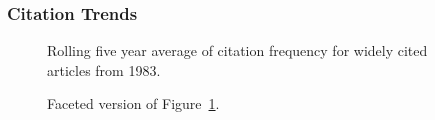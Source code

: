 \documentclass[
  10pt,
  letterpaper,
  DIV=11,
  numbers=noendperiod,
  twoside]{scrartcl}
\begin{document}
\subsubsection*{Citation Trends}\label{sec-trends-1983}

\begin{figure}


\caption{\label{fig-citation-spaghetti-1983}Rolling five year average of
citation frequency for widely cited articles from 1983.}

\end{figure}%

\begin{figure}


\caption{\label{fig-citation-facet-1983}Faceted version of
Figure~\ref{fig-citation-spaghetti-1983}.}

\end{figure}%
\end{document}
